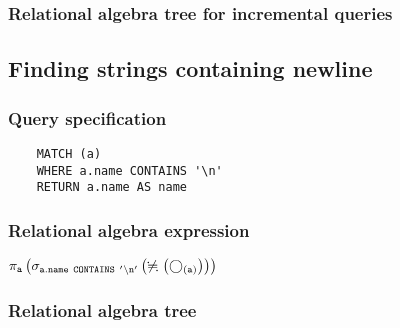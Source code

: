 	\subsubsection*{Relational algebra tree for incremental queries}

	\subsection{Finding strings containing newline}

	\subsubsection*{Query specification}

	\begin{lstlisting}
	MATCH (a)
	WHERE a.name CONTAINS '\n'
	RETURN a.name AS name
	\end{lstlisting}


	\subsubsection*{Relational algebra expression}

	$\projection{\var{a}} \left(\selection{\mathtt{a.name~CONTAINS~'\backslash{}n'}} \left(\alldifferent{} \left(\getvertices{a}{}\right)\right)\right)$

	\subsubsection*{Relational algebra tree}


